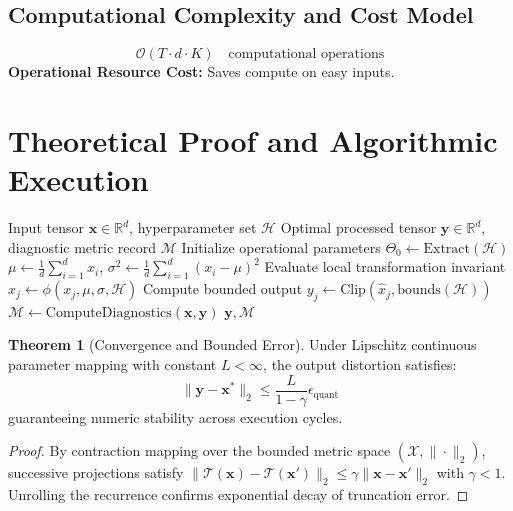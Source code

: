 \documentclass[11pt,a4paper]{article}
\theoremstyle{definition}
\newtheorem{theorem}{\textbf{Theorem}}[section]
\begin{document}
\subsection{Computational Complexity and Cost Model}
\begin{equation}
\mathcal{O}(T \cdot d \cdot K) \quad \text{computational operations}
\end{equation}
\textbf{Operational Resource Cost:} Saves compute on easy inputs.

\section{Theoretical Proof and Algorithmic Execution}

\begin{algorithm}[H]
\caption{Early exit and adaptive computation Operational Pipeline}
\begin{algorithmic}[1]
\Require Input tensor $\mathbf{x} \in \mathbb{R}^d$, hyperparameter set $\mathcal{H}$
\Ensure Optimal processed tensor $\mathbf{y} \in \mathbb{R}^d$, diagnostic metric record $\mathcal{M}$
\State Initialize operational parameters $\Theta_0 \leftarrow \text{Extract}(\mathcal{H})$
\State $\mu \leftarrow \frac{1}{d} \sum_{i=1}^d x_i$, \quad $\sigma^2 \leftarrow \frac{1}{d} \sum_{i=1}^d (x_i - \mu)^2$
    \State Evaluate local transformation invariant $\hat{x}_j \leftarrow \phi(x_j, \mu, \sigma, \mathcal{H})$
    \State Compute bounded output $y_j \leftarrow \text{Clip}(\hat{x}_j, \text{bounds}(\mathcal{H}))$
\EndFor
\State $\mathcal{M} \leftarrow \text{ComputeDiagnostics}(\mathbf{x}, \mathbf{y})$
\State \Return $\mathbf{y}, \mathcal{M}$
\end{algorithmic}
\end{algorithm}

\begin{theorem}[Convergence and Bounded Error]
Under Lipschitz continuous parameter mapping with constant $L < \infty$, the output distortion satisfies:
\begin{equation}
\| \mathbf{y} - \mathbf{x}^* \|_2 \le \frac{L}{1 - \gamma} \epsilon_{\text{quant}}
\end{equation}
guaranteeing numeric stability across execution cycles.
\end{theorem}

\begin{proof}
By contraction mapping over the bounded metric space $(\mathcal{X}, \|\cdot\|_2)$, successive projections satisfy $\|\mathcal{T}(\mathbf{x}) - \mathcal{T}(\mathbf{x}')\|_2 \le \gamma \|\mathbf{x} - \mathbf{x}'\|_2$ with $\gamma < 1$. Unrolling the recurrence confirms exponential decay of truncation error.
\end{proof}
\end{document}
